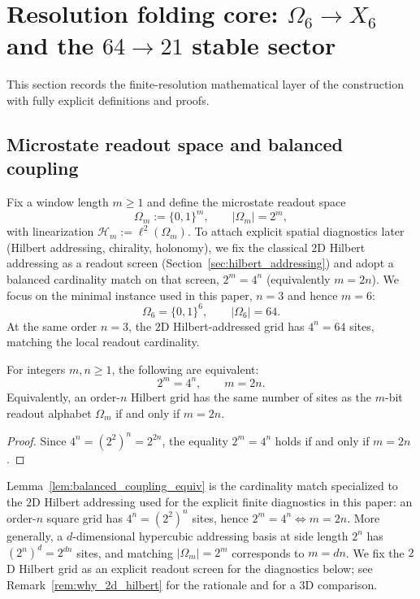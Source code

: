 
\section{Resolution folding core: \texorpdfstring{$\Omega_6\to X_6$}{Omega6->X6} and the \texorpdfstring{$64\to 21$}{64->21} stable sector}
\label{sec:folding_core}

This section records the finite-resolution mathematical layer of the construction with fully explicit definitions and proofs.

\subsection{Microstate readout space and balanced coupling}
\label{subsec:microstate_space}

Fix a window length $m\ge 1$ and define the microstate readout space
\[
\Omega_m:=\{0,1\}^m,\qquad |\Omega_m|=2^m,
\]
with linearization $\mathcal{H}_m:=\ell^2(\Omega_m)$.
To attach explicit spatial diagnostics later (Hilbert addressing, chirality, holonomy), we fix the classical $2$D Hilbert addressing as a readout screen (Section~\ref{sec:hilbert_addressing}) and adopt a balanced cardinality match on that screen, $2^m=4^n$ (equivalently $m=2n$).
We focus on the minimal instance used in this paper, $n=3$ and hence $m=6$:
\[
\Omega_6=\{0,1\}^6,\qquad |\Omega_6|=64.
\]
At the same order $n=3$, the $2$D Hilbert-addressed grid has $4^n=64$ sites, matching the local readout cardinality.

\begin{lemma}\label{lem:balanced_coupling_equiv}
For integers $m,n\ge 1$, the following are equivalent:
\[
2^m=4^n,\qquad m=2n.
\]
Equivalently, an order-$n$ Hilbert grid has the same number of sites as the $m$-bit readout alphabet $\Omega_m$ if and only if $m=2n$.
\end{lemma}
\begin{proof}
Since $4^n=(2^2)^n=2^{2n}$, the equality $2^m=4^n$ holds if and only if $m=2n$.
\end{proof}

\begin{remark}\label{rem:balanced_coupling_dimension}
Lemma~\ref{lem:balanced_coupling_equiv} is the cardinality match specialized to the $2$D Hilbert addressing used for the explicit finite diagnostics in this paper: an order-$n$ square grid has $4^n=(2^2)^n$ sites, hence $2^m=4^n\iff m=2n$.
More generally, a $d$-dimensional hypercubic addressing basis at side length $2^n$ has $(2^n)^d=2^{dn}$ sites, and matching $|\Omega_m|=2^m$ corresponds to $m=dn$.
We fix the $2$D Hilbert grid as an explicit readout screen for the diagnostics below; see Remark~\ref{rem:why_2d_hilbert} for the rationale and for a $3$D comparison.
\end{remark}

